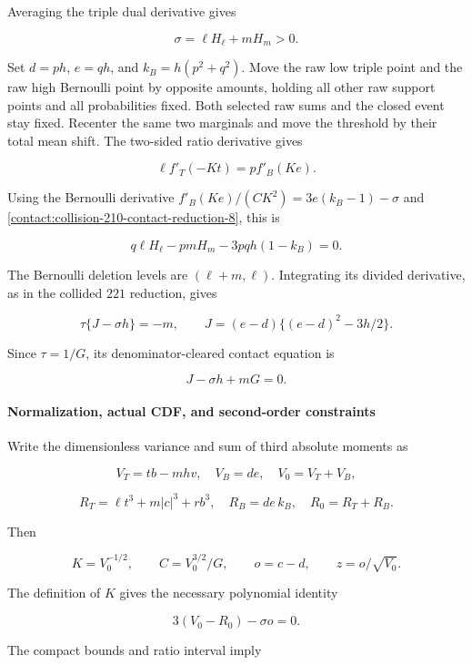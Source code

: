 Averaging the triple dual derivative gives

\[
 \boxed{\quad \sigma=\ell H_{\ell}+mH_m>0.\quad}
\tag{B.16.8}\label{contact:collision-210-contact-reduction-8}
\]

Set $d=ph$, $e=qh$, and $k_B=h(p^2+q^2)$. Move the raw low triple
point and the raw high Bernoulli point by opposite amounts, holding
all other raw support points and all probabilities fixed. Both selected
raw sums and the closed event stay fixed. Recenter the same two
marginals and move the threshold by their total mean shift. The
two-sided ratio derivative gives

\[
 \ell f'_T(-Kt)=p f'_B(Ke).
\]

Using the Bernoulli derivative
$f'_B(Ke)/(CK^2)=3e(k_B-1)-\sigma$ and \eqref{contact:collision-210-contact-reduction-8}, this is

\[
 \boxed{\quad q\ell H_{\ell}-pmH_m-3pq h(1-k_B)=0.\quad}
\tag{B.16.9}\label{contact:collision-210-contact-reduction-9}
\]

The Bernoulli deletion levels are $(\ell+m,\ell)$. Integrating its divided
derivative, as in the collided $221$ reduction, gives

\[
 \tau\{J-\sigma h\}=-m,\qquad
 J=(e-d)\{(e-d)^2-3h/2\}.
\]

Since $\tau=1/G$, its denominator-cleared contact equation is

\[
 \boxed{\quad J-\sigma h+mG=0.\quad}
\tag{B.16.10}\label{contact:collision-210-contact-reduction-10}
\]

\paragraph{Normalization, actual CDF, and second-order constraints}

Write the dimensionless variance and sum of third absolute moments as

\[
 V_T=tb-mhv,\quad V_B=de,\quad V_0=V_T+V_B,
\]

\[
 R_T=\ell t^3+m|c|^3+r b^3,\quad R_B=de\,k_B,
 \quad R_0=R_T+R_B.
\]

Then

\[
 K=V_0^{-1/2},\qquad C=V_0^{3/2}/G,\qquad
 o=c-d,\qquad z=o/\sqrt{V_0}.
\]

The definition of $K$ gives the necessary polynomial identity

\[
 \boxed{\quad 3(V_0-R_0)-\sigma o=0.\quad}
\tag{B.16.11}\label{contact:collision-210-contact-reduction-11}
\]

The compact bounds and ratio interval imply

